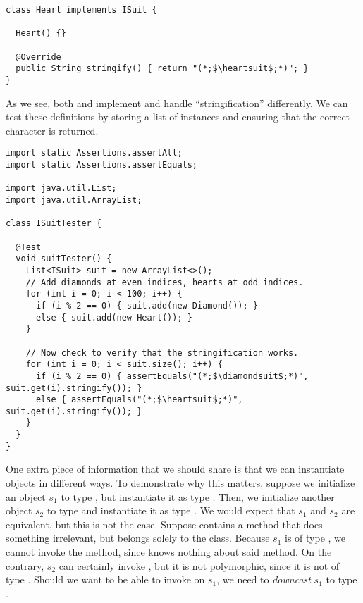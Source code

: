 \begin{lstlisting}[language=MyJava]
class Heart implements ISuit {
    
  Heart() {}

  @Override
  public String stringify() { return "(*;$\heartsuit$;*)"; }
}
\end{lstlisting}

As we see, both  and  implement  and handle ``stringification'' differently. We can test these definitions by storing a list of  instances and ensuring that the correct character is returned.

\begin{lstlisting}[language=MyJava]
import static Assertions.assertAll;
import static Assertions.assertEquals;

import java.util.List;
import java.util.ArrayList;

class ISuitTester {

  @Test
  void suitTester() {
    List<ISuit> suit = new ArrayList<>();
    // Add diamonds at even indices, hearts at odd indices.
    for (int i = 0; i < 100; i++) {
      if (i % 2 == 0) { suit.add(new Diamond()); }
      else { suit.add(new Heart()); }
    }

    // Now check to verify that the stringification works.
    for (int i = 0; i < suit.size(); i++) {
      if (i % 2 == 0) { assertEquals("(*;$\diamondsuit$;*)", suit.get(i).stringify()); }
      else { assertEquals("(*;$\heartsuit$;*)", suit.get(i).stringify()); }
    }
  }
}
\end{lstlisting}

One extra piece of information that we should share is that we can instantiate objects in different ways. To demonstrate why this matters, suppose we initialize an object $s_1$ to type , but instantiate it as type . Then, we initialize another object $s_2$ to type  and instantiate it as type . We would expect that $s_1$ and $s_2$ are equivalent, but this is not the case. Suppose  contains a method  that does something irrelevant, but belongs solely to the  class. Because $s_1$ is of type , we cannot invoke the  method, since  knows nothing about said method. On the contrary, $s_2$ can certainly invoke , but it is not polymorphic, since it is not of type . Should we want to be able to invoke  on $s_1$, we need to \emph{downcast} $s_1$ to type .

